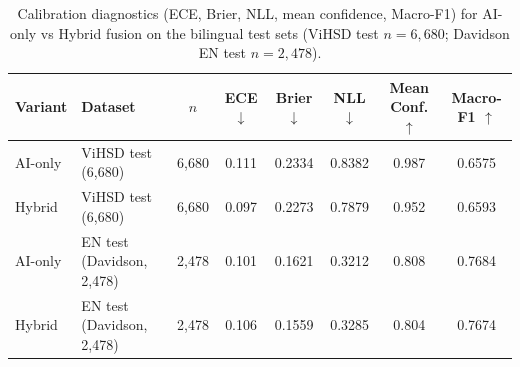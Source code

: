 \begin{table}[H]
\centering
\caption{Calibration diagnostics (ECE, Brier, NLL, mean confidence, Macro-F1) for AI-only vs Hybrid fusion on the bilingual test sets (ViHSD test $n{=}6{,}680$; Davidson EN test $n{=}2{,}478$).}
\label{tab:hybrid-calibration}
\begin{tabular}{llcccccc}
\toprule
Variant & Dataset & $n$ & ECE $\downarrow$ & Brier $\downarrow$ & NLL $\downarrow$ & Mean Conf. $\uparrow$ & Macro-F1 $\uparrow$ \\
\midrule
AI-only & ViHSD test (6,680) & 6,680 & 0.111 & 0.2334 & 0.8382 & 0.987 & 0.6575 \\
Hybrid & ViHSD test (6,680) & 6,680 & 0.097 & 0.2273 & 0.7879 & 0.952 & 0.6593 \\
AI-only & EN test (Davidson, 2,478) & 2,478 & 0.101 & 0.1621 & 0.3212 & 0.808 & 0.7684 \\
Hybrid & EN test (Davidson, 2,478) & 2,478 & 0.106 & 0.1559 & 0.3285 & 0.804 & 0.7674 \\
\bottomrule
\end{tabular}
\end{table}
